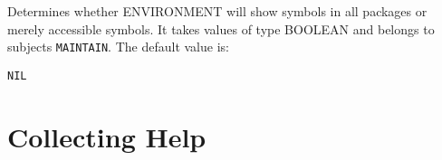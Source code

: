 \begin{description} 
\item[SHOW-ALL-PACKAGES]  
Determines whether ENVIRONMENT will show symbols in all packages
or merely accessible symbols.
It takes values of type BOOLEAN and belongs to subjects \texttt{MAINTAIN}.  The default value is: \begin{lstlisting}
NIL
\end{lstlisting}

\item
\end{description}

\section{Collecting Help}

